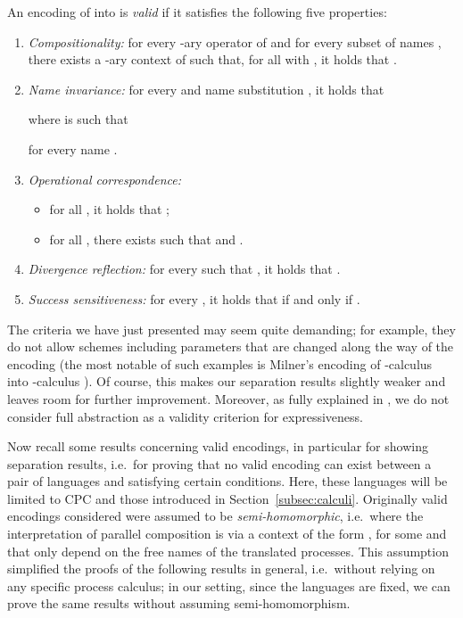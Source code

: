 \documentclass{LMCS}
\begin{document}
\begin{defi}
\label{def:ve}
An encoding  of  into 
is {\em valid} if it satisfies the following five properties:
\begin{enumerate}
\item {\em Compositionality:} for every -ary operator  of 
and for every subset of names ,
there exists a -ary context  of 
such that, for all  with , it holds
that .

\item {\em Name invariance:}
for every  and name substitution , it holds that

where  is such that 

for every name .

\item {\em Operational correspondence:}
\begin{itemize}
\item for all , it holds that ;
\item for all , there exists  such that  
and .
\end{itemize}

\item {\em Divergence reflection:}
for every  such that 
, it holds that 
\linebreak  \mbox{}.

\item {\em Success sensitiveness:}
for every , it holds that  if and only if .
\end{enumerate}
\end{defi}

The criteria we have just presented may seem quite demanding; for example,
they do not allow schemes including parameters that are changed along the 
way of the encoding (the most notable of such examples is Milner's encoding
of -calculus into -calculus \cite{Milner92}). Of course, this
makes our separation results slightly weaker and leaves room for further
improvement. Moreover, as fully explained in \cite{GN:MSCS14}, we do not 
consider full abstraction as a validity criterion for expressiveness.

Now recall some results concerning valid encodings, in particular for showing
separation results, i.e.\ for proving that no valid encoding can exist between
a pair of languages  and  satisfying certain
conditions.
Here, these languages will be limited to CPC and those introduced in Section~\ref{subsec:calculi}.
Originally valid encodings considered were assumed to be {\em semi-homomorphic}, 
i.e.\ where the interpretation of parallel
  composition is via a context of the form , for some  and  that only depend on the
  free names of the translated processes.
This assumption simplified the proofs of the following results in general, i.e.\ without
relying on any specific process calculus; in our setting, since the languages are fixed,
we can prove the same results without assuming semi-homomorphism.
\end{document}
